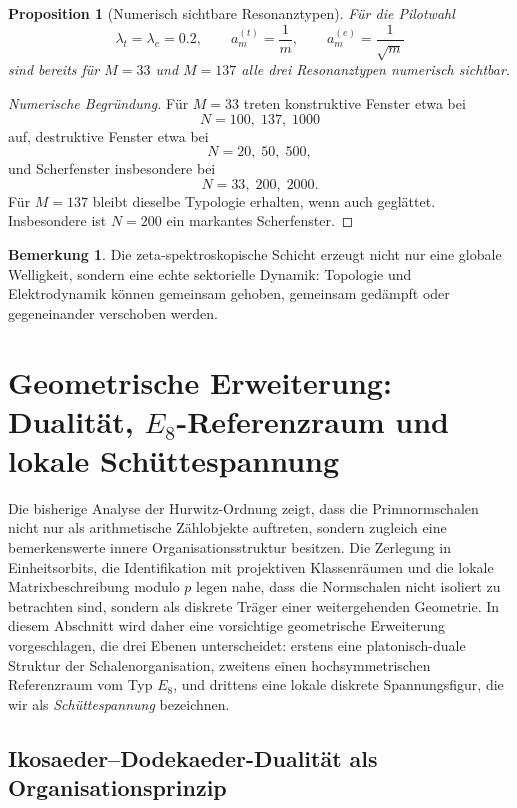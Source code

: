 \documentclass[a4paper,12pt]{article}
\newtheorem{proposition}[satz]{Proposition}
\theoremstyle{definition}
\newtheorem{bemerkung}[satz]{Bemerkung}
\numberwithin{equation}{section}
\begin{document}
	\begin{proposition}[Numerisch sichtbare Resonanztypen]
		Für die Pilotwahl
		\[
		\lambda_t=\lambda_e=0.2,\qquad
		a_m^{(t)}=\frac1m,\qquad
		a_m^{(e)}=\frac1{\sqrt m}
		\]
		sind bereits für \(M=33\) und \(M=137\) alle drei Resonanztypen numerisch sichtbar.
	\end{proposition}
	
	\begin{proof}[Numerische Begründung]
		Für \(M=33\) treten konstruktive Fenster etwa bei
		\[
		N=100,\;137,\;1000
		\]
		auf, destruktive Fenster etwa bei
		\[
		N=20,\;50,\;500,
		\]
		und Scherfenster insbesondere bei
		\[
		N=33,\;200,\;2000.
		\]
		Für \(M=137\) bleibt dieselbe Typologie erhalten, wenn auch geglättet. Insbesondere ist \(N=200\) ein markantes Scherfenster.
	\end{proof}
	
	\begin{bemerkung}
		Die zeta-spektroskopische Schicht erzeugt nicht nur eine globale Welligkeit, sondern eine echte sektorielle Dynamik: Topologie und Elektrodynamik können gemeinsam gehoben, gemeinsam gedämpft oder gegeneinander verschoben werden.
	\end{bemerkung}
	
	
	\section{Geometrische Erweiterung: Dualität, $E_8$-Referenzraum und lokale Schüttespannung}
	
	Die bisherige Analyse der Hurwitz-Ordnung zeigt, dass die Primnormschalen nicht nur als arithmetische Zählobjekte auftreten, sondern zugleich eine bemerkenswerte innere Organisationsstruktur besitzen. Die Zerlegung in Einheitsorbits, die Identifikation mit projektiven Klassenräumen und die lokale Matrixbeschreibung modulo $p$ legen nahe, dass die Normschalen nicht isoliert zu betrachten sind, sondern als diskrete Träger einer weitergehenden Geometrie. In diesem Abschnitt wird daher eine vorsichtige geometrische Erweiterung vorgeschlagen, die drei Ebenen unterscheidet: erstens eine platonisch-duale Struktur der Schalenorganisation, zweitens einen hochsymmetrischen Referenzraum vom Typ $E_8$, und drittens eine lokale diskrete Spannungsfigur, die wir als \emph{Schüttespannung} bezeichnen.
	
	\subsection{Ikosaeder--Dodekaeder-Dualität als Organisationsprinzip}
	
\end{document}
